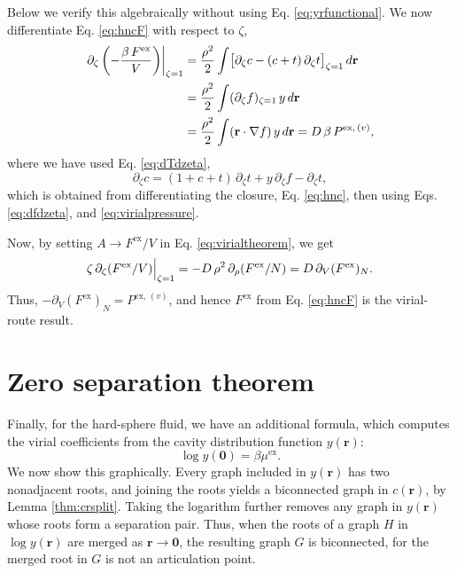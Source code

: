 \documentclass[preprint]{revtex4-1}
\newcommand{\vct}[1]{\mathbf{#1}}
\providecommand{\vr}{} %
\renewcommand{\vr}{\vct{r}}
\newcommand{\supex}[1]{ { { #1 }^{ \mathrm{ex} } } }
\newcommand{\supexv}[1]{ { { #1 }^{ \mathrm{ex}, \, (v) } } }
\newcommand{\Pex}{\supex{P}}
\newcommand{\Pexv}{\supexv{P}}
\newcommand{\Fex}{\supex{F}}
\newcommand{\muex}{\supex{\mu}}
\begin{document}
Below we verify this algebraically\cite{morita1960}
without using Eq. \eqref{eq:yrfunctional}.
%
We now differentiate Eq. \eqref{eq:hncF} with respect to $\zeta$,
\begin{align}
  \left. \partial_\zeta \left(-\frac{ \beta\,\Fex }{ V }\right) \right|_{\zeta = 1}
&=
\frac{\rho^2}{2} \int
  \bigl[
    \partial_\zeta c - (c + t) \, \partial_\zeta t
  \bigr]_{\zeta = 1} \, d\vr
  \notag \\
&= \frac{\rho^2}{2} \int (\partial_\zeta f)_{\zeta = 1} \, y \, d\vr
  \notag \\
&= \frac{\rho^2}{2} \int (\vr \cdot \nabla f) \, y \, d\vr
= D \, \beta \, \Pexv,
  \notag
\end{align}
%
where we have used Eq. \eqref{eq:dTdzeta},
\[
  \partial_\zeta c
  = (1 + c + t) \, \partial_\zeta t
  + y \, \partial_\zeta f - \partial_\zeta t,
\]
which is obtained from
differentiating the closure, Eq. \eqref{eq:hnc},
then using Eqs. \eqref{eq:dfdzeta}, and \eqref{eq:virialpressure}.

Now, by setting $A \rightarrow \Fex / V$
in Eq. \eqref{eq:virialtheorem}, we get
\begin{align}
  \zeta \, \partial_\zeta (\Fex/V) \Big|_{\zeta = 1}
  = -D \, \rho^2 \, \partial_\rho (\Fex/N)
  = D \, \partial_V (\Fex)_N.
    \notag %
\end{align}
Thus, $-\partial_V (\Fex)_N = \Pexv$,
and hence $\Fex$ from Eq. \eqref{eq:hncF}
is the virial-route result.
%





\section{Zero separation theorem}

Finally, for the hard-sphere fluid, we have an additional formula,
  which computes the virial coefficients
  from the cavity distribution function $y(\vr)$\cite{hoover1962}:
%
\begin{equation}
  \log y(\vct0) = \beta \muex.
  \label{eq:yrzerosep}
\end{equation}
%
We now show this graphically.
%
Every graph included in $y(\vr)$
  has two nonadjacent roots\cite{hansen},
%
  and joining the roots
  yields a biconnected graph in $c(\vr)$,
  by Lemma \ref{thm:crsplit}.
%
Taking the logarithm further
  removes any graph in $y(\vr)$
  whose roots form
  a separation pair\cite{hansen}.
%
Thus, when the roots of a graph $H$ in $\log y(\vr)$
  are merged as $\vr \rightarrow \vct0$,
  the resulting graph $G$ is biconnected,
  for the merged root in $G$ is not an articulation point.
\end{document}
